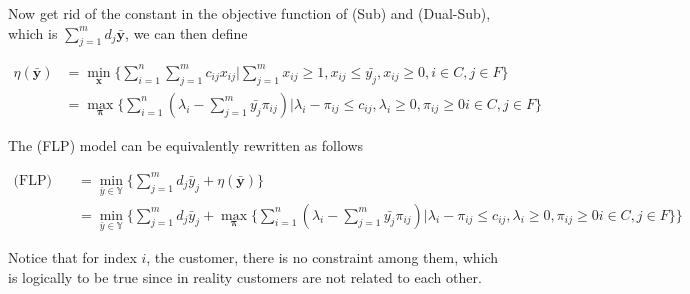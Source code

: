             Now get rid of the constant in the objective function of (Sub) and (Dual-Sub), which is $\sum_{j = 1}^m d_j \bar{\mathbf{y}}$, we can then define

            \begin{align*}
                \eta(\bar{\mathbf{y}}) &= \min_\mathbf{x} \{\sum_{i = 1}^n \sum_{j = 1}^m c_{ij} x_{ij} | \sum_{j = 1}^m x_{ij} \ge 1, x_{ij} \le \bar{y_j}, x_{ij} \ge 0, i \in C, j \in F\}\\
                &= \max_\mathbf{\pi} \{\sum_{i=1}^n (\lambda_i - \sum_{j = 1}^m \bar{y_j} \pi_{ij})|\lambda_i - \pi_{ij} \le c_{ij}, \lambda_i \ge 0, \pi_{ij} \ge 0 i \in C, j \in F\}
            \end{align*}

            The (FLP) model can be equivalently rewritten as follows

            \begin{align*}
                \text{(FLP)} \quad & = \min_{\bar{y} \in \mathbb{Y}}\{\sum_{j = 1}^m d_j \bar{y}_j + \eta(\bar{\mathbf{y}})\}\\
                & = \min_{\bar{y} \in \mathbb{Y}} \{\sum_{j = 1}^m d_j \bar{y}_j + \max_\mathbf{\pi} \{\sum_{i=1}^n (\lambda_i - \sum_{j = 1}^m \bar{y_j} \pi_{ij})|\lambda_i - \pi_{ij} \le c_{ij}, \lambda_i \ge 0, \pi_{ij} \ge 0 i \in C, j \in F\}\}
            \end{align*}

            Notice that for index $i$, the customer, there is no constraint among them, which is logically to be true since in reality customers are not related to each other. 

